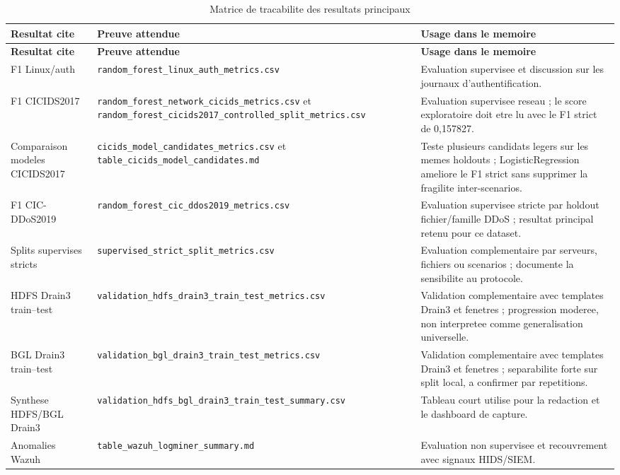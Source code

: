 \begin{longtable}{p{3.2cm}p{4.2cm}p{5.5cm}}
\caption{Matrice de tracabilite des resultats principaux}\\
\toprule
\textbf{Resultat cite} & \textbf{Preuve attendue} & \textbf{Usage dans le memoire} \\
\midrule
\endfirsthead
\toprule
\textbf{Resultat cite} & \textbf{Preuve attendue} & \textbf{Usage dans le memoire} \\
\midrule
\endhead
F1 Linux/auth & \texttt{random\_forest\_linux\_auth\_metrics.csv} & Evaluation supervisee et discussion sur les journaux d'authentification. \\
F1 CICIDS2017 & \texttt{random\_forest\_network\_cicids\_metrics.csv} et \texttt{random\_forest\_cicids2017\_controlled\_split\_metrics.csv} & Evaluation supervisee reseau ; le score exploratoire doit etre lu avec le F1 strict de 0,157827. \\
Comparaison modeles CICIDS2017 & \texttt{cicids\_model\_candidates\_metrics.csv} et \texttt{table\_cicids\_model\_candidates.md} & Teste plusieurs candidats legers sur les memes holdouts ; LogisticRegression ameliore le F1 strict sans supprimer la fragilite inter-scenarios. \\
F1 CIC-DDoS2019 & \texttt{random\_forest\_cic\_ddos2019\_metrics.csv} & Evaluation supervisee stricte par holdout fichier/famille DDoS ; resultat principal retenu pour ce dataset. \\
Splits supervises stricts & \texttt{supervised\_strict\_split\_metrics.csv} & Evaluation complementaire par serveurs, fichiers ou scenarios ; documente la sensibilite au protocole. \\
HDFS Drain3 train--test & \texttt{validation\_hdfs\_drain3\_train\_test\_metrics.csv} & Validation complementaire avec templates Drain3 et fenetres ; progression moderee, non interpretee comme generalisation universelle. \\
BGL Drain3 train--test & \texttt{validation\_bgl\_drain3\_train\_test\_metrics.csv} & Validation complementaire avec templates Drain3 et fenetres ; separabilite forte sur split local, a confirmer par repetitions. \\
Synthese HDFS/BGL Drain3 & \texttt{validation\_hdfs\_bgl\_drain3\_train\_test\_summary.csv} & Tableau court utilise pour la redaction et le dashboard de capture. \\
Anomalies Wazuh & \texttt{table\_wazuh\_logminer\_summary.md} & Evaluation non supervisee et recouvrement avec signaux HIDS/SIEM. \\

\end{longtable}
